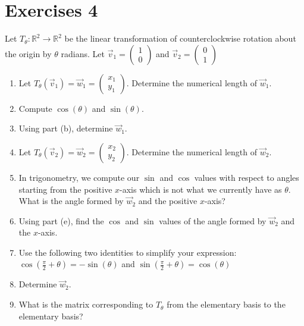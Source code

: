 \section{Exercises 4}
\begin{exercise}
    Let $T_{\theta}:\mathbb{R}^2\to\mathbb{R}^2$ be the linear transformation of counterclockwise rotation about the origin by $\theta$ radians. Let $\vec{v}_1=\begin{pmatrix}
        1 \\ 0
    \end{pmatrix}$ and $\vec{v}_2=\begin{pmatrix}
        0 \\ 1
    \end{pmatrix}$
    \begin{enumerate}[label=(\alph*)]
        \item Let $T_{\theta}(\vec{v}_1)=\vec{w}_1=\begin{pmatrix}
            x_1 \\ y_1
        \end{pmatrix}$. Determine the numerical length of $\vec{w}_1$.
        \item Compute $\cos(\theta)$ and $\sin(\theta)$.
        \item Using part (b), determine $\vec{w}_1$.
        \item Let $T_{\theta}(\vec{v}_2)=\vec{w}_2=\begin{pmatrix}
            x_2 \\ y_2
        \end{pmatrix}$. Determine the numerical length of $\vec{w}_2$.
        \item In trigonometry, we compute our $\sin$ and $\cos$ values with respect to angles starting from the positive $x$-axis which is not what we currently have as $\theta$. What is the angle formed by $\vec{w}_2$ and the positive $x$-axis?
        \item Using part (e), find the $\cos$ and $\sin$ values of the angle formed by $\vec{w}_2$ and the $x$-axis.
        \item Use the following two identities to simplify your expression: $\cos(\frac{\pi}{2}+\theta)=-\sin(\theta)$ and $\sin(\frac{\pi}{2}+\theta)=\cos(\theta)$
        \item Determine $\vec{w}_2$.
        \item What is the matrix corresponding to $T_{\theta}$ from the elementary basis to the elementary basis?
    \end{enumerate}
\end{exercise}
